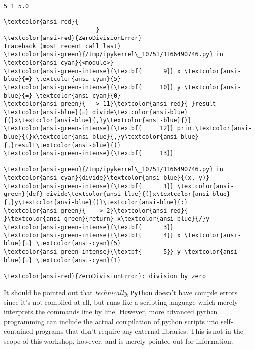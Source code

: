     \begin{Verbatim}[commandchars=\\\{\}]
5 1 5.0
    \end{Verbatim}

    \begin{Verbatim}[commandchars=\\\{\}, frame=single, framerule=2mm, rulecolor=\color{outerrorbackground}]
\textcolor{ansi-red}{---------------------------------------------------------------------------}
\textcolor{ansi-red}{ZeroDivisionError}                         Traceback (most recent call last)
\textcolor{ansi-green}{/tmp/ipykernel\_10751/1166490746.py} in \textcolor{ansi-cyan}{<module>}
\textcolor{ansi-green-intense}{\textbf{      9}} x \textcolor{ansi-blue}{=} \textcolor{ansi-cyan}{5}
\textcolor{ansi-green-intense}{\textbf{     10}} y \textcolor{ansi-blue}{=} \textcolor{ansi-cyan}{0}
\textcolor{ansi-green}{---> 11}\textcolor{ansi-red}{ }result \textcolor{ansi-blue}{=} divide\textcolor{ansi-blue}{(}x\textcolor{ansi-blue}{,}y\textcolor{ansi-blue}{)}
\textcolor{ansi-green-intense}{\textbf{     12}} print\textcolor{ansi-blue}{(}x\textcolor{ansi-blue}{,}y\textcolor{ansi-blue}{,}result\textcolor{ansi-blue}{)}
\textcolor{ansi-green-intense}{\textbf{     13}} 

\textcolor{ansi-green}{/tmp/ipykernel\_10751/1166490746.py} in \textcolor{ansi-cyan}{divide}\textcolor{ansi-blue}{(x, y)}
\textcolor{ansi-green-intense}{\textbf{      1}} \textcolor{ansi-green}{def} divide\textcolor{ansi-blue}{(}x\textcolor{ansi-blue}{,}y\textcolor{ansi-blue}{)}\textcolor{ansi-blue}{:}
\textcolor{ansi-green}{----> 2}\textcolor{ansi-red}{     }\textcolor{ansi-green}{return} x\textcolor{ansi-blue}{/}y
\textcolor{ansi-green-intense}{\textbf{      3}} 
\textcolor{ansi-green-intense}{\textbf{      4}} x \textcolor{ansi-blue}{=} \textcolor{ansi-cyan}{5}
\textcolor{ansi-green-intense}{\textbf{      5}} y \textcolor{ansi-blue}{=} \textcolor{ansi-cyan}{1}

\textcolor{ansi-red}{ZeroDivisionError}: division by zero
    \end{Verbatim}

    It should be pointed out that \emph{technically}, \texttt{Python}
doesn't have compile errors since it's not compiled at all, but runs
like a scripting language which merely interprets the commands line by
line. However, more advanced python programming can include the actual
compilation of python scripts into self-contained programs that don't
require any external libraries. This is not in the scope of this
workshop, however, and is merely pointed out for information.
